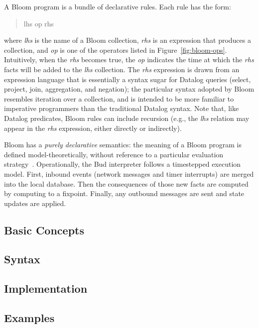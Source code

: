 A Bloom program is a bundle of declarative rules. Each rule has the form:
\begin{quotation}
lhs op rhs
\end{quotation}
where \emph{lhs} is the name of a Bloom collection, \emph{rhs} is an expression
that produces a collection, and \emph{op} is one of the operators listed in
Figure~\ref{fig:bloom-ops}. Intuitively, when the \emph{rhs} becomes true, the
\emph{op} indicates the time at which the \emph{rhs} facts will be added to the
\emph{lhs} collection. The \emph{rhs} expression is drawn from an expression
language that is essentially a syntax sugar for Datalog queries (select,
project, join, aggregation, and negation); the particular syntax adopted by
Bloom resembles iteration over a collection, and is intended to be more familiar
to imperative programmers than the traditional Datalog syntax. Note that, like
Datalog predicates, Bloom rules can include recursion (e.g., the \emph{lhs}
relation may appear in the \emph{rhs} expression, either directly or
indirectly).

Bloom has a \emph{purely declarative} semantics: the meaning of a Bloom program
is defined model-theoretically, without reference to a particular evaluation
strategy~\cite{dedalus}. Operationally, the Bud interpreter follows a
timestepped execution model. First, inbound events (network messages and timer
interrupts) are merged into the local database. Then the consequences of those
new facts are computed by computing to a fixpoint. Finally, any outbound
messages are sent and state updates are applied.

\subsection{Basic Concepts}

\subsection{Syntax}

\subsection{Implementation}

\subsection{Examples}

